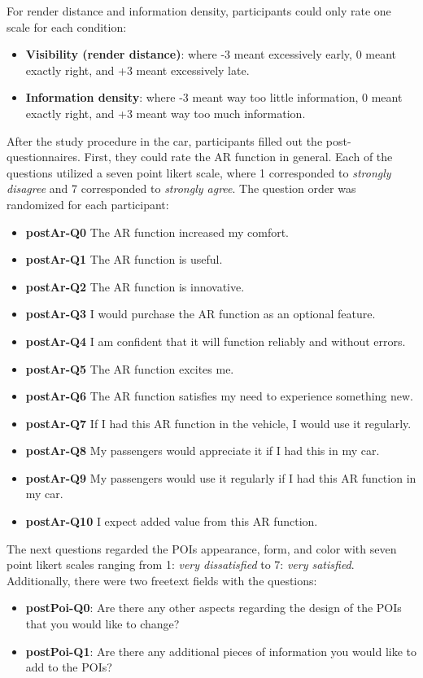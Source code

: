 For render distance and information density, participants could only rate one scale for each condition:
\begin{itemize}
    \item \textbf{Visibility (render distance)}: where -3 meant excessively early, 0 meant exactly right, and +3 meant excessively late.
    \item \textbf{Information density}: where -3 meant way too little information, 0 meant exactly right, and +3 meant way too much information.
\end{itemize}



After the study procedure in the car, participants filled out the post-questionnaires. First, they could rate the AR function in general. Each of the questions utilized a seven point likert scale, where 1 corresponded to \textit{strongly disagree} and 7 corresponded to \textit{strongly agree}. The question order was randomized for each participant:
\begin{itemize}
    \item \textbf{postAr-Q0} The AR function increased my comfort.
    \item \textbf{postAr-Q1} The AR function is useful.
    \item \textbf{postAr-Q2} The AR function is innovative.
    \item \textbf{postAr-Q3} I would purchase the AR function as an optional feature.
    \item \textbf{postAr-Q4} I am confident that it will function reliably and without errors.
    \item \textbf{postAr-Q5} The AR function excites me.
    \item \textbf{postAr-Q6} The AR function satisfies my need to experience something new.
    \item \textbf{postAr-Q7} If I had this AR function in the vehicle, I would use it regularly.
    \item \textbf{postAr-Q8} My passengers would appreciate it if I had this in my car.
    \item \textbf{postAr-Q9} My passengers would use it regularly if I had this AR function in my car.
    \item \textbf{postAr-Q10} I expect added value from this AR function.
\end{itemize}


The next questions regarded the POIs appearance, form, and color with seven point likert scales ranging from 1: \textit{very dissatisfied} to 7: \textit{very satisfied}. Additionally, there were two freetext fields with the questions: 
\begin{itemize}
    \item \textbf{postPoi-Q0}: Are there any other aspects regarding the design of the POIs that you would like to change?
    \item \textbf{postPoi-Q1}: Are there any additional pieces of information you would like to add to the POIs?
\end{itemize}



